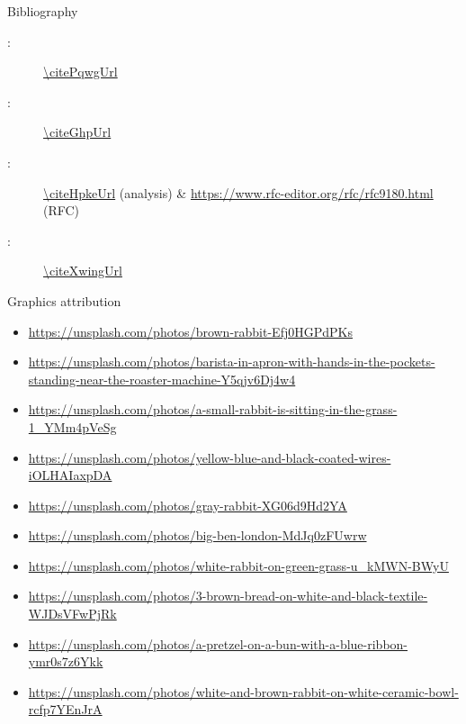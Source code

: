 
\begin{frame}{Bibliography}
  \begin{description}
    \item[\citePqwg:] \url{\citePqwgUrl}
    \item[\citeGhp:] \url{\citeGhpUrl}
    \item[\citeHpke:] \url{\citeHpkeUrl} (analysis) \& \url{https://www.rfc-editor.org/rfc/rfc9180.html} (RFC)
    \item[\citeXwing:] \url{\citeXwingUrl}
  \end{description}
\end{frame}

\begin{frame}{Graphics attribution}
  \tiny
  \begin{itemize}
    \item \url{https://unsplash.com/photos/brown-rabbit-Efj0HGPdPKs}
    \item \url{https://unsplash.com/photos/barista-in-apron-with-hands-in-the-pockets-standing-near-the-roaster-machine-Y5qjv6Dj4w4}
    \item \url{https://unsplash.com/photos/a-small-rabbit-is-sitting-in-the-grass-1_YMm4pVeSg}
    \item \url{https://unsplash.com/photos/yellow-blue-and-black-coated-wires-iOLHAIaxpDA}
    \item \url{https://unsplash.com/photos/gray-rabbit-XG06d9Hd2YA}
    \item \url{https://unsplash.com/photos/big-ben-london-MdJq0zFUwrw}
    \item \url{https://unsplash.com/photos/white-rabbit-on-green-grass-u_kMWN-BWyU}
    \item \url{https://unsplash.com/photos/3-brown-bread-on-white-and-black-textile-WJDsVFwPjRk}
    \item \url{https://unsplash.com/photos/a-pretzel-on-a-bun-with-a-blue-ribbon-ymr0s7z6Ykk}
    \item \url{https://unsplash.com/photos/white-and-brown-rabbit-on-white-ceramic-bowl-rcfp7YEnJrA}
  \end{itemize}
\end{frame}
